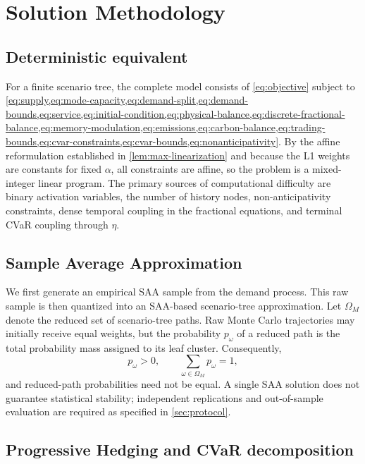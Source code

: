 \documentclass[11pt,a4paper]{article}
\begin{document}
\section{Solution Methodology}
\label{sec:solution}

\subsection{Deterministic equivalent}

For a finite scenario tree, the complete model consists of
\cref{eq:objective} subject to
\cref{eq:supply,eq:mode-capacity,eq:demand-split,eq:demand-bounds,eq:service,eq:initial-condition,eq:physical-balance,eq:discrete-fractional-balance,eq:memory-modulation,eq:emissions,eq:carbon-balance,eq:trading-bounds,eq:cvar-constraints,eq:cvar-bounds,eq:nonanticipativity}.
By the affine reformulation established in \cref{lem:max-linearization}
and because the L1 weights are constants for fixed \(\alpha\), all
constraints are affine, so the problem is a mixed-integer linear
program. The
primary sources of computational difficulty are binary activation
variables, the number of history nodes, non-anticipativity constraints,
dense temporal coupling in the fractional equations, and terminal CVaR
coupling through \(\eta\).

\subsection{Sample Average Approximation}

We first generate an empirical SAA sample from the demand process.
This raw sample is then quantized into an SAA-based scenario-tree
approximation. Let
\(\Omega_M\) denote the reduced set of scenario-tree paths. Raw Monte
Carlo trajectories may initially receive equal weights, but the
probability \(p_\omega\) of a reduced path is the total probability mass
assigned to its leaf cluster. Consequently,
\[
  p_\omega>0,
  \qquad
  \sum_{\omega\in\Omega_M}p_\omega=1,
\]
and reduced-path probabilities need not be equal. A single SAA solution
does not guarantee statistical stability; independent replications and
out-of-sample evaluation are required as specified in
\cref{sec:protocol}.

\subsection{Progressive Hedging and CVaR decomposition}
\end{document}
